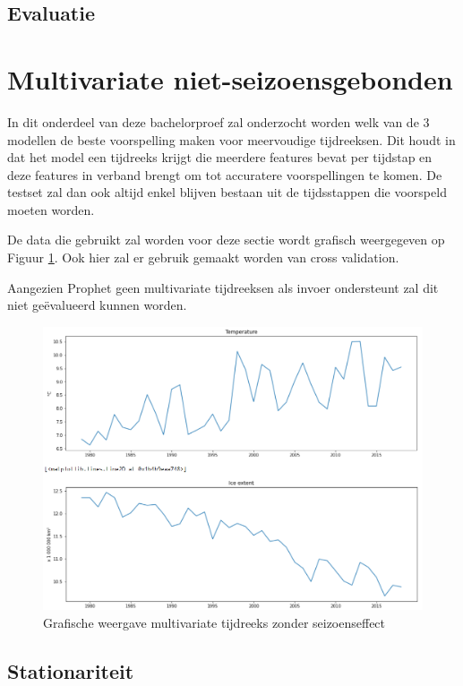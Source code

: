 \subsection{Evaluatie}
\clearpage

\section{Multivariate niet-seizoensgebonden}
In dit onderdeel van deze bachelorproef zal onderzocht worden welk van de 3 modellen de beste voorspelling maken voor meervoudige tijdreeksen. Dit houdt in dat het model een tijdreeks krijgt die meerdere features bevat per tijdstap en deze features in verband brengt om tot accuratere voorspellingen te komen. De testset zal dan ook altijd enkel blijven bestaan uit de tijdsstappen die voorspeld moeten worden.

De data die gebruikt zal worden voor deze sectie wordt grafisch weergegeven op Figuur \ref{fig:mvnsdata}. Ook hier zal er gebruik gemaakt worden van cross validation.

Aangezien Prophet geen multivariate tijdreeksen als invoer ondersteunt zal dit niet ge\"{e}valueerd kunnen worden.

\begin{figure}
    \centering
    \caption{Grafische weergave multivariate tijdreeks zonder seizoenseffect}
    \label{fig:mvnsdata}
    \includegraphics[width=1\linewidth]{mv_ns_data}
\end{figure}

\subsection{Stationariteit}

